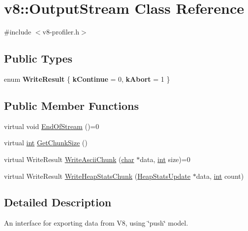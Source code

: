 \hypertarget{classv8_1_1OutputStream}{}\section{v8\+:\+:Output\+Stream Class Reference}
\label{classv8_1_1OutputStream}


{\ttfamily \#include $<$v8-\/profiler.\+h$>$}

\subsection*{Public Types}
\begin{DoxyCompactItemize}
\item 
\mbox{\label{classv8_1_1OutputStream_a336c7605a0ce4fbe6f6fca3b03bc16de}} 
enum {\bfseries Write\+Result} \{ {\bfseries k\+Continue} = 0, 
{\bfseries k\+Abort} = 1
 \}
\end{DoxyCompactItemize}
\subsection*{Public Member Functions}
\begin{DoxyCompactItemize}
\item 
virtual void \mbox{\hyperlink{classv8_1_1OutputStream_a6c5c308367fc5776bcbedff0e94d6049}{End\+Of\+Stream}} ()=0
\item 
virtual \mbox{\hyperlink{classint}{int}} \mbox{\hyperlink{classv8_1_1OutputStream_a93bdaa790cbd66a7283fad2cca3f48f7}{Get\+Chunk\+Size}} ()
\item 
virtual Write\+Result \mbox{\hyperlink{classv8_1_1OutputStream_a42adc62ebe43d00159f80328538f217f}{Write\+Ascii\+Chunk}} (\mbox{\hyperlink{classchar}{char}} $\ast$data, \mbox{\hyperlink{classint}{int}} size)=0
\item 
virtual Write\+Result \mbox{\hyperlink{classv8_1_1OutputStream_a104fd1a0b5ef685e1d4967aaacbb9e9d}{Write\+Heap\+Stats\+Chunk}} (\mbox{\hyperlink{structv8_1_1HeapStatsUpdate}{Heap\+Stats\+Update}} $\ast$data, \mbox{\hyperlink{classint}{int}} count)
\end{DoxyCompactItemize}


\subsection{Detailed Description}
An interface for exporting data from V8, using \char`\"{}push\char`\"{} model. 

